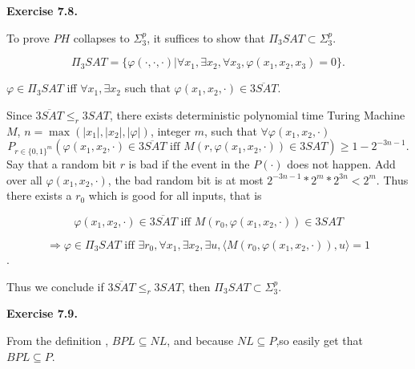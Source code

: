 \documentclass[a4paper]{article}
\newenvironment{exercise}[1]{
	\par
	\noindent\textbf{Exercise #1.}\quad
}{
	\par
	\bigskip
}
\begin{document}
\begin{exercise}{7.8}
To prove $PH$ collapses to $\Sigma_3^p$, it suffices to show that $\Pi_3 SAT\subset \Sigma_3^p$.

$$
\Pi_3 SAT=\{\varphi(\cdot,\cdot,\cdot)| \forall x_1, \exists x_2, \forall x_3, \varphi(x_1,x_2,x_3)=0\}.
$$

$\varphi\in \Pi_3SAT$ iff $\forall x_1, \exists x_2$ such that $\varphi(x_1,x_2,\cdot)\in \overline{3SAT}$.

Since $\overline{3SAT}\leq_r 3SAT$, there exists deterministic polynomial time Turing Machine $M$,  $n=\max(|x_1|,|x_2|,|\varphi|)$, integer $m$, such that $\forall \varphi(x_1,x_2,\cdot)$
$$
P_{r\in\{0,1\}^m}(  \varphi(x_1,x_2,\cdot)\in \overline{3SAT} \text{ iff } M(r,\varphi(x_1,x_2,\cdot))\in 3SAT)\geq 1- 2^{-3n-1}.
$$ 
Say that a random bit $r$ is bad if the event in the $P(\cdot)$ does not happen. Add over all  $\varphi(x_1,x_2,\cdot)$, the bad random bit is at most $2^{-3n-1}*2^{m}*2^{3n}<2^{m}$. Thus there exists a $r_0$ which is good for all inputs, that is

$$
 \varphi(x_1,x_2,\cdot)\in \overline{3SAT} \text{ iff } M(r_0,\varphi(x_1,x_2,\cdot))\in 3SAT
$$

$$
\Rightarrow 
\varphi\in \Pi_3SAT \text{ iff } \exists r_0, \forall x_1, \exists x_2, \exists u,   \langle M(r_0,\varphi(x_1,x_2,\cdot)), u\rangle =1
$$.

 


Thus we conclude if $\overline{3SAT}\leq_r 3SAT$, then $\Pi_3 SAT\subset \Sigma_3^p$.
\end{exercise}

\begin{exercise}{7.9}
	
	From the definition , $BPL\subseteq NL$, and because $NL\subseteq P$,so easily get that $BPL\subseteq P$. 
	
\end{exercise}
\end{document}
